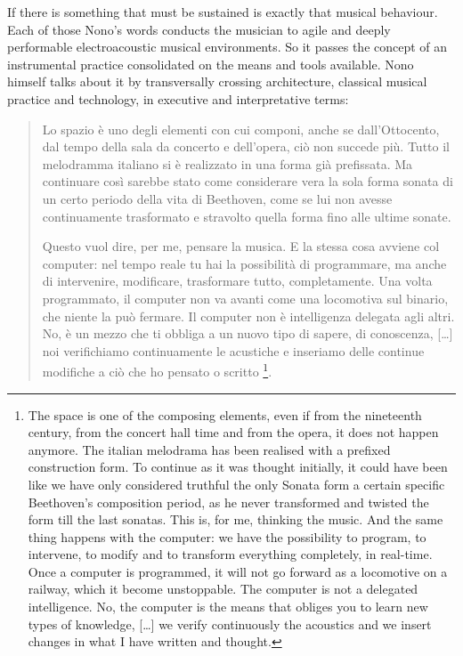 \documentclass[twoside,a4paper]{article}
\begin{document}
If there is something that must be sustained is exactly that musical behaviour. Each of those Nono's words conducts the musician to agile and deeply performable electroacoustic musical environments. So it  passes the concept of an instrumental practice consolidated on the means and tools available. Nono himself talks about it by transversally crossing architecture, classical musical practice and technology, in executive and interpretative terms:

\begin{quote}
Lo spazio è uno degli elementi con cui componi, anche se dall'Ottocento, dal tempo della sala da concerto e dell'opera, ciò non succede più.
Tutto il melodramma italiano si è realizzato in una forma già prefissata. Ma continuare così sarebbe stato come considerare vera la sola forma sonata di un certo periodo della vita di Beethoven, come se lui non avesse continuamente trasformato e stravolto quella forma fino alle ultime sonate.

Questo vuol dire, per me, pensare la musica. E la stessa cosa avviene col computer: nel tempo reale tu hai la possibilità di programmare, ma anche di intervenire, modificare, trasformare tutto, completamente. Una volta programmato, il computer non va avanti come una locomotiva sul binario, che niente la può fermare. Il computer non è intelligenza delegata agli altri. No, è un mezzo che ti obbliga a un nuovo tipo di sapere, di conoscenza, [\ldots] %
noi verifichiamo continuamente le acustiche e inseriamo delle continue modifiche a ciò che ho pensato o scritto \cite{nono84}\footnote{The space is one of the composing elements, even if from the nineteenth century, from the concert hall time and from the opera, it does not happen anymore. The italian melodrama has been realised with a prefixed construction form. To continue as it was thought initially, it could have been like we have only considered truthful the only Sonata form a certain specific Beethoven's composition period, as he never transformed and twisted the form till the last sonatas. This is, for me, thinking the music. And the same thing happens with the computer: we have the possibility to program, to intervene, to modify and to transform everything completely, in real-time. Once a computer is programmed, it will not go forward as a locomotive on a railway, which it become unstoppable. The computer is not a delegated intelligence. No, the computer is the means that obliges you to learn new types of knowledge, [\ldots] we verify continuously the acoustics and we insert changes in what I have written and thought.}.
\end{quote}
\end{document}
